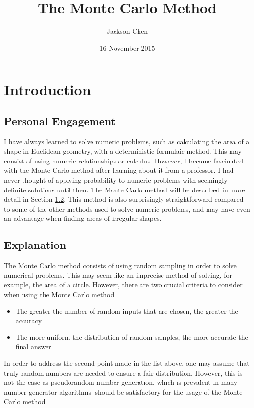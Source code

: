 \documentclass[10pt, letterpaper]{article}
\newcommand{\subtitle}[1]{
  \posttitle{
    \par\end{center}
    \begin{center}\large#1\end{center}
    \vskip0.5em}
}
\begin{document}
  \title{The Monte Carlo Method}
  \subtitle {IB Math HL Period 5, Dr. Silverman}
  \date{16 November 2015}
  \author{Jackson Chen}
  \maketitle

  \section{Introduction}

  \subsection{Personal Engagement}

  I have always learned to solve numeric problems, such as calculating the area of a shape in Euclidean geometry,
  with a deterministic formulaic method. This may consist of using numeric relationships or calculus. However, I became fascinated with
  the Monte Carlo method after learning about it from a professor. I had never thought of applying probability to numeric problems
  with seemingly definite solutions until then. The Monte Carlo method will be described in more detail in Section \ref{subsec:explanation}.
  This method is also surprisingly straightforward compared to some of
  the other methods used to solve numeric problems, and may have even an advantage when finding areas of irregular shapes.

  \subsection{Explanation} \label{subsec:explanation}

  The Monte Carlo method consists of using random sampling in order to solve numerical problems. This may seem like an imprecise method
  of solving, for example, the area of a circle. However, there are two crucial criteria to consider when using the Monte Carlo method:
  \begin{itemize}
    \item The greater the number of random inputs that are chosen, the greater the accuracy
    \item The more uniform the distribution of random samples, the more accurate the final answer
  \end{itemize}

  In order to address the second point made in the list above, one may assume that truly random numbers are needed to ensure a fair distribution.
  However, this is not the case as pseudorandom number generation, which is prevalent in many number generator algorithms, should be satisfactory
  for the usage of the Monte Carlo method.
\end{document}
